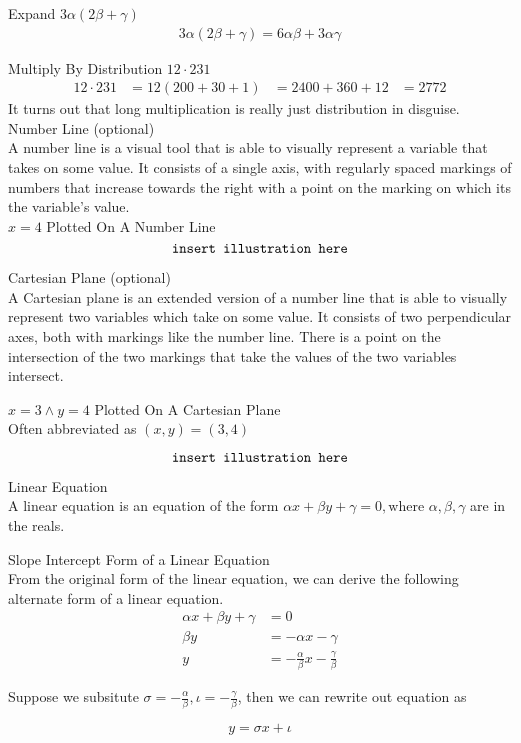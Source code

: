 \documentclass{book}
\begin{document}
  {\example Expand $3 \alpha(2 \beta + \gamma)$ 
    \begin{align*}
      3 \alpha (2 \beta + \gamma) = 6 \alpha \beta + 3 \alpha \gamma
    \end{align*}
  }

  {\example Multiply By Distribution $12 \cdot 231$
    \begin{align*}
      12 \cdot 231 & = 12 (200 + 30 + 1)
      & = 2400 + 360 + 12
      & = 2772
    \end{align*}
    It turns out that long multiplication is really just distribution in disguise.
  }\\

  {\remark Number Line (optional) \\
    A number line is a visual tool that is able to visually represent a variable that takes on some value. It consists of a single axis, with regularly spaced markings of numbers that increase towards the right with a point on the marking on which its the variable's value.
  }\\

  {\example $x = 4$ Plotted On A Number Line\\
    $$\text{\texttt{insert illustration here}}$$
  }

  {\remark Cartesian Plane (optional) \\
    A Cartesian plane is an extended version of a number line that is able to visually represent two variables which take on some value. It consists of two perpendicular axes, both with markings like the number line. There is a point on the intersection of the two markings that take the values of the two variables intersect.
  }\\

  {\example $x = 3 \land y = 4$ Plotted On A Cartesian Plane \\
    Often abbreviated as $(x, y) = (3, 4)$

    $$\text{\texttt{insert illustration here}}$$
  }

  {\remark Linear Equation \\
    A linear equation is an equation of the form $\alpha x + \beta y + \gamma = 0, \text{where } \alpha, \beta, \gamma$ are in the reals.
  }\\

  {\remark Slope Intercept Form of a Linear Equation \\
    From the original form of the linear equation, we can derive the following alternate form of a linear equation.
    \begin{align*}
      \alpha x + \beta y + \gamma & = 0\\
      \beta y & = - \alpha x - \gamma\\
      y & = -\frac{\alpha}{\beta} x - \frac{\gamma}{\beta}
    \end{align*}

    Suppose we subsitute $\sigma = - \frac{\alpha}{\beta}, \iota = - \frac{\gamma}{\beta}$, then we can rewrite out equation as

    $$y = \sigma x + \iota$$
  }
\end{document}
